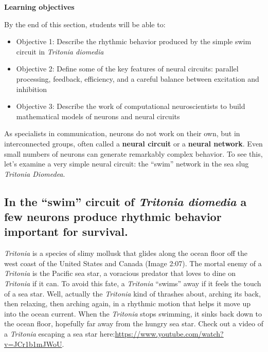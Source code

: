 \documentclass[
]{book}
\begin{document}
\textbf{Learning objectives}

By the end of this section, students will be able to:

\begin{itemize}
\item
  Objective 1: Describe the rhythmic behavior produced by the simple swim circuit in \emph{Tritonia diomedia}
\item
  Objective 2: Define some of the key features of neural circuits: parallel processing, feedback, efficiency, and a careful balance between excitation and inhibition
\item
  Objective 3: Describe the work of computational neuroscientists to build mathematical models of neurons and neural circuits
\end{itemize}

As specialists in communication, neurons do not work on their own, but in interconnected groups, often called a \textbf{neural circuit} or a \textbf{neural network}. Even small numbers of neurons can generate remarkably complex behavior. To see this, let's examine a very simple neural circuit: the ``swim'' network in the sea slug \emph{Tritonia Diomedea}.

\hypertarget{in-the-swim-circuit-of-tritonia-diomedia-a-few-neurons-produce-rhythmic-behavior-important-for-survival.}{%
\subsection{\texorpdfstring{In the ``swim'' circuit of \emph{Tritonia diomedia} a few neurons produce rhythmic behavior important for survival.}{In the ``swim'' circuit of Tritonia diomedia a few neurons produce rhythmic behavior important for survival.}}\label{in-the-swim-circuit-of-tritonia-diomedia-a-few-neurons-produce-rhythmic-behavior-important-for-survival.}}

\emph{Tritonia} is a species of slimy mollusk that glides along the ocean floor off the west coast of the United States and Canada (Image 2:07). The mortal enemy of a \emph{Tritonia} is the Pacific sea star, a voracious predator that loves to dine on \emph{Tritonia} if it can. To avoid this fate, a \emph{Tritonia} ``swims'' away if it feels the touch of a sea star. Well, actually the \emph{Tritonia} kind of thrashes about, arching its back, then relaxing, then arching again, in a rhythmic motion that helps it move up into the ocean current. When the \emph{Tritonia} stops swimming, it sinks back down to the ocean floor, hopefully far away from the hungry sea star. Check out a video of a \emph{Tritonia} escaping a sea star here:\url{https://www.youtube.com/watch?v=JCr1b1mJWoU}.
\end{document}
